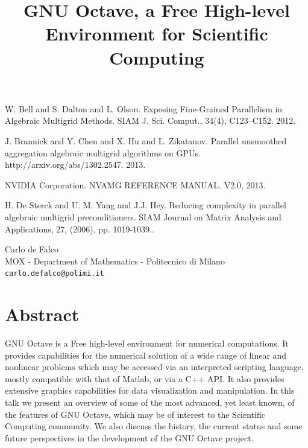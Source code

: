 \documentclass[article, A4, 11pt]{llncs}%
\begin{document}

\begin{thebibliography}{10}
{\sc W. Bell and S. Dalton and L. Olson}. {Exposing Fine-Grained Parallelism in Algebraic Multigrid Methods}. SIAM J. Sci. Comput., 34(4), C123–C152. 2012.

{\sc J. Brannick and Y. Chen and X. Hu and L. Zikatanov}. {Parallel unsmoothed aggregation algebraic multigrid algorithms on GPUs}. http://arxiv.org/abs/1302.2547. 2013.

{\sc NVIDIA Corporation}. {NVAMG REFERENCE MANUAL}. V2.0, 2013.

{\sc H. De Sterck and U. M. Yang and J.J. Hey}. {Reducing complexity in parallel algebraic multigrid preconditioners}. SIAM Journal on Matrix Analysis and Applications, 27, (2006), pp. 1019-1039..
\end{thebibliography} %

\title{GNU Octave, a Free High-level Environment for Scientific Computing}
 \author{} \institute{}
\maketitle
\begin{center}
{\large Carlo de Falco}\\
MOX - Department of Mathematics - Politecnico di Milano\\
{\tt carlo.defalco@polimi.it}
\end{center}

\section*{Abstract}
GNU Octave is a Free high-level environment for numerical computations. It provides capabilities for the numerical solution of a wide range of linear and nonlinear problems which may be accessed via an interpreted scripting language, mostly compatible with that of Matlab, or via a C++ API. It also provides extensive graphics capabilities for data visualization and manipulation. In this talk we present an overview of some of the most advanced, yet least known, of the features of GNU Octave, which may be of interest to the Scientific Computing community. We also discuss the history, the current status and some future perspectives in the development of the GNU Octave project.
\end{document}
